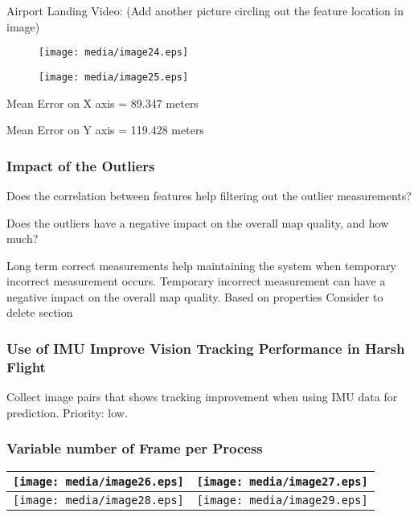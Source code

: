 Airport Landing Video: (Add another picture circling out the feature 
location in image)

\begin{figure}[h]
\centering
\texttt{[image: media/image24.eps]}
\end{figure}


\begin{figure}[h]
\centering
\texttt{[image: media/image25.eps]}
\end{figure}


Mean Error on X axis = 89.347 meters

Mean Error on Y axis = 119.428 meters

\subsubsection{Impact of the Outliers}
Does the correlation between features help filtering out the outlier 
measurements?

Does the outliers have a negative impact on the overall map quality, and 
how much?

Long term correct measurements help maintaining the system when 
temporary incorrect measurement occurs. Temporary incorrect measurement 
can have a negative impact on the overall map quality. Based on 
properties Consider to delete section

\subsubsection{Use of IMU Improve Vision Tracking Performance in Harsh 
Flight}\label{section:_Toc332876148}
Collect image pairs that shows tracking improvement when using IMU data 
for prediction. Priority: low.

\subsubsection{Variable number of Frame per Process}
\begin{table}[h]
\centering
\begin{tabular}{|l|l|}
\hline
\texttt{[image: media/image26.eps]}
 & \texttt{[image: media/image27.eps]}
 \\
\hline
\texttt{[image: media/image28.eps]}
 & \texttt{[image: media/image29.eps]}
 \\
\hline
\end{tabular}
\end{table}








